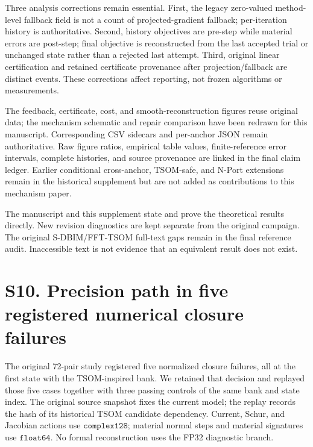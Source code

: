 \documentclass[11pt]{article}
\begin{document}
Three analysis corrections remain essential. First, the legacy zero-valued method-level fallback field is not a count of projected-gradient fallback; per-iteration history is authoritative. Second, history objectives are pre-step while material errors are post-step; final objective is reconstructed from the last accepted trial or unchanged state rather than a rejected last attempt. Third, original linear certification and retained certificate provenance after projection/fallback are distinct events. These corrections affect reporting, not frozen algorithms or measurements.

The feedback, certificate, cost, and smooth-reconstruction figures reuse original data; the mechanism schematic and repair comparison have been redrawn for this manuscript. Corresponding CSV sidecars and per-anchor JSON remain authoritative. Raw figure ratios, empirical table values, finite-reference error intervals, complete histories, and source provenance are linked in the final claim ledger. Earlier conditional cross-anchor, TSOM-safe, and N-Port extensions remain in the historical supplement but are not added as contributions to this mechanism paper.

The manuscript and this supplement state and prove the theoretical results directly. New revision diagnostics are kept separate from the original campaign. The original S-DBIM/FFT-TSOM full-text gaps remain in the final reference audit. Inaccessible text is not evidence that an equivalent result does not exist.

\section*{S10. Precision path in five registered numerical closure failures}

The original 72-pair study registered five normalized closure failures, all at the first state with the TSOM-inspired bank. We retained that decision and replayed those five cases together with three passing controls of the same bank and state index. The original source snapshot fixes the current model; the replay records the hash of its historical TSOM candidate dependency. Current, Schur, and Jacobian actions use \(\texttt{complex128}\); material normal steps and material signatures use \(\texttt{float64}\). No formal reconstruction uses the FP32 diagnostic branch.
\end{document}
